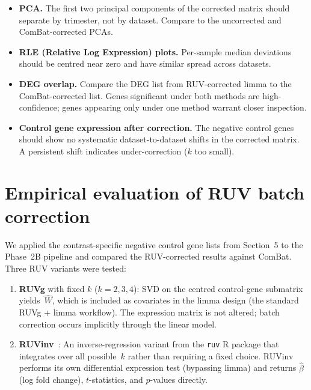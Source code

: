 \documentclass[11pt,a4paper]{article}
\begin{document}
\begin{itemize}
  \item \textbf{PCA.}  The first two principal components of the
        corrected matrix should separate by trimester, not by dataset.
        Compare to the uncorrected and ComBat-corrected PCAs.
  \item \textbf{RLE (Relative Log Expression) plots.}  Per-sample
        median deviations should be centred near zero and have similar
        spread across datasets.
  \item \textbf{DEG overlap.}  Compare the DEG list from
        RUV-corrected limma to the ComBat-corrected list.  Genes
        significant under both methods are high-confidence; genes
        appearing only under one method warrant closer inspection.
  \item \textbf{Control gene expression after correction.}  The
        negative control genes should show no systematic
        dataset-to-dataset shifts in the corrected matrix.  A
        persistent shift indicates under-correction ($k$ too small).
\end{itemize}


\section{Empirical evaluation of RUV batch correction}

We applied the contrast-specific negative control gene lists from
Section~5 to the Phase~2B pipeline and compared the RUV-corrected
results against ComBat.  Three RUV variants were tested:

\begin{enumerate}
  \item \textbf{RUVg} with fixed $k$ ($k = 2, 3, 4$): SVD on the
        centred control-gene submatrix yields~$\hat{W}$, which is
        included as covariates in the limma design (the standard
        RUVg + limma workflow).  The expression matrix is not
        altered; batch correction occurs implicitly through the
        linear model.
  \item \textbf{RUVinv}~\cite{gagnonbartsch2013}: An
        inverse-regression variant from the \texttt{ruv} R package that
        integrates over all possible~$k$ rather than requiring a fixed
        choice.  RUVinv performs its own differential expression test
        (bypassing limma) and returns $\hat{\beta}$ (log fold
        change), $t$-statistics, and $p$-values directly.
\end{enumerate}
\end{document}

